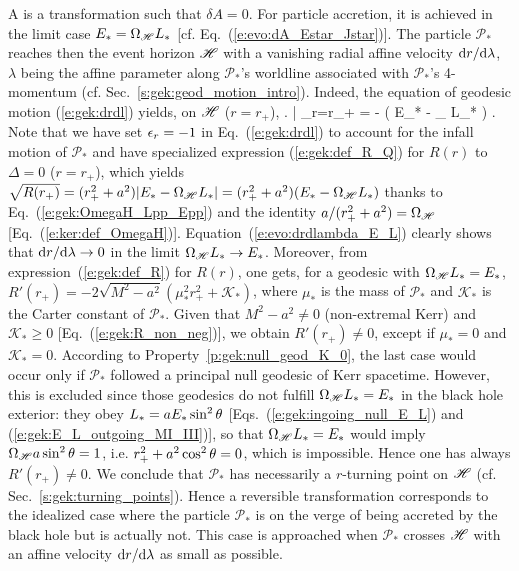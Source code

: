 A 
is a transformation such that $\delta A = 0$. For particle accretion, it is
achieved in the limit case $E_* = \Omega_{\mathscr{H}}  L_*$ [cf. Eq.~(\ref{e:evo:dA_Estar_Jstar})].
The particle $\mathscr{P}_*$ reaches then the event horizon $\mathscr{H}$ with
a vanishing radial affine velocity $\mathrm{d} r / \mathrm{d}\lambda$,
$\lambda$ being the affine parameter along $\mathscr{P}_*$'s worldline associated
with $\mathscr{P}_*$'s 4-momentum (cf. Sec.~\ref{s:gek:geod_motion_intro}).
Indeed, the equation of geodesic motion (\ref{e:gek:drdl}) yields,
on $\mathscr{H}$ ($r=r_+$),
\be \label{e:evo:drdlambda_E_L}
    \left.  \right| _{r=r_+} =
     -  ( E_* - \Omega_{\Hor}  L_* ) .
\ee
Note that we have set $\epsilon_r  = -1$ in Eq.~(\ref{e:gek:drdl}) to account for the infall motion
of $\mathscr{P}_*$ and have specialized expression (\ref{e:gek:def_R_Q}) for $R(r)$ to $\Delta = 0$
($r = r_+$), which yields $\sqrt{R(r_+)} = (r_+^2 + a^2) |E_* - \Omega_{\mathscr{H}}  L_*| =
(r_+^2 + a^2)(E_* - \Omega_{\mathscr{H}}  L_*)$
thanks to Eq.~(\ref{e:gek:OmegaH_Lpp_Epp}) and the
identity $a / (r_+^2 + a^2) =\Omega_{\mathscr{H}}$ [Eq.~(\ref{e:ker:def_OmegaH})].
Equation~(\ref{e:evo:drdlambda_E_L}) clearly shows that
$\mathrm{d} r / \mathrm{d}\lambda \to 0$ in the limit $\Omega_{\mathscr{H}}  L_* \to E_*$.
Moreover, from expression~(\ref{e:gek:def_R}) for $R(r)$, one gets, for a geodesic
with $\Omega_{\mathscr{H}}  L_* = E_*$,
$R'(r_+) = - 2 \sqrt{M^2 - a^2} (\mu_*^2  r_+^2 + \mathscr{K}_*)$, where $\mu_*$ is the
mass of $\mathscr{P}_*$ and $\mathscr{K}_*$ is the Carter constant of $\mathscr{P}_*$.
Given that $M^2 - a^2\neq 0$ (non-extremal Kerr) and $\mathscr{K}_* \geq 0$ [Eq.~(\ref{e:gek:R_non_neg})], we obtain $R'(r_+) \neq 0$, except if $\mu_*=0$ and $\mathscr{K}_* = 0$.
According to Property~\ref{p:gek:null_geod_K_0},
the last case would occur only if $\mathscr{P}_*$ followed a principal null geodesic of Kerr
spacetime. However, this is excluded since those geodesics do not fulfill
$\Omega_{\mathscr{H}}  L_* = E_*$ in the black hole exterior: they obey $L_* = a E_* \sin^2\theta$
[Eqs.~(\ref{e:gek:ingoing_null_E_L}) and (\ref{e:gek:E_L_outgoing_MI_III})],
so  that $\Omega_{\mathscr{H}}  L_* = E_*$ would imply $\Omega_{\mathscr{H}} a \sin^2\theta = 1$,
i.e. $r_+^2 + a^2 \cos^2\theta = 0$, which is impossible.
Hence one has always $R'(r_+) \neq 0$. We conclude
that $\mathscr{P}_*$ has necessarily a $r$-turning point on $\mathscr{H}$
(cf. Sec.~\ref{s:gek:turning_points}).
Hence a reversible transformation corresponds to the idealized case where
the particle $\mathscr{P}_*$ is on the verge of being accreted by the black hole
but is actually not. This case is approached when $\mathscr{P}_*$ crosses $\mathscr{H}$
with an affine velocity $\mathrm{d} r / \mathrm{d}\lambda$ as small as possible.

